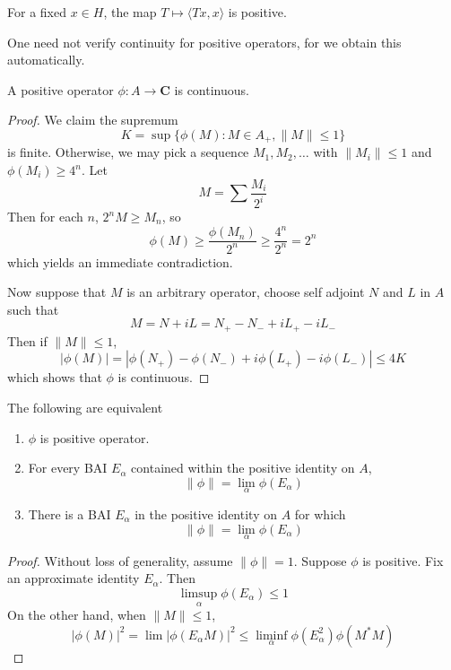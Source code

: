 \begin{example}
    For a fixed $x \in H$, the map $T \mapsto \langle Tx, x \rangle$ is positive.
\end{example}

One need not verify continuity for positive operators, for we obtain this automatically.

\begin{prop}
    A positive operator $\phi:A \to \mathbf{C}$ is continuous.
\end{prop}
\begin{proof}
    We claim the supremum
    \[ K = \sup \{ \phi(M): M \in A_+, \| M \| \leq 1 \} \]
    is finite. Otherwise, we may pick a sequence $M_1, M_2, \dots$ with $\| M_i \| \leq 1$ and $\phi(M_i) \geq 4^n$. Let
    \[ M = \sum \frac{M_i}{2^i} \]
    Then for each $n$, $2^n M \geq M_n$, so
    \[ \phi(M) \geq \frac{\phi(M_n)}{2^n} \geq \frac{4^n}{2^n} = 2^n \]
    which yields an immediate contradiction.

    Now suppose that $M$ is an arbitrary operator, choose self adjoint $N$ and $L$ in $A$ such that
    \[ M = N + iL = N_+ - N_- + iL_+ - iL_- \]
    Then if $\| M \| \leq 1$,
    \[ |\phi(M)| = |\phi(N_+) - \phi(N_-) + i\phi(L_+) - i\phi(L_-)| \leq 4K \]
    which shows that $\phi$ is continuous.
\end{proof}

\begin{theorem}
    The following are equivalent
    \begin{enumerate}
        \item $\phi$ is positive operator.
        \item For every BAI $E_\alpha$ contained within the positive identity on $A$,
        \[ \| \phi \| = \lim_\alpha \phi(E_\alpha) \]
        \item There is a BAI $E_\alpha$ in the positive identity on $A$ for which
        \[ \| \phi \| = \lim_\alpha \phi(E_\alpha) \]
    \end{enumerate}
\end{theorem}
\begin{proof}
    Without loss of generality, assume $\| \phi \| = 1$. Suppose $\phi$ is positive. Fix an approximate identity $E_\alpha$. Then
    \[ \limsup_\alpha \phi(E_\alpha) \leq 1 \]
    On the other hand, when $\| M \| \leq 1$,
    \[ |\phi(M)|^2 = \lim |\phi(E_\alpha M)|^2 \leq \liminf_\alpha \phi(E_\alpha^2) \phi(M^*M) \]
\end{proof}








